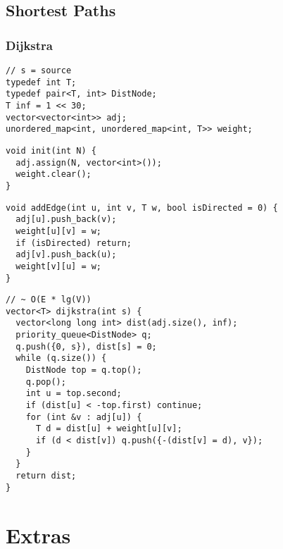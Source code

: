 \documentclass[twoside]{article}
\newcommand{\fileTitleStyle}{\raggedleft\underline}
\begin{document}
\begin{multicols*}{2}
\vspace{0em}
\subsection*{Shortest Paths}
\vspace{2em}
\subsubsectionfont{\fileTitleStyle}
\subsubsection*{Dijkstra}
\begin{verbatim}
// s = source
typedef int T;
typedef pair<T, int> DistNode;
T inf = 1 << 30;
vector<vector<int>> adj;
unordered_map<int, unordered_map<int, T>> weight;
\end{verbatim}
\vspace{-12pt}
\begin{verbatim}
void init(int N) {
  adj.assign(N, vector<int>());
  weight.clear();
}
\end{verbatim}
\vspace{-12pt}
\begin{verbatim}
void addEdge(int u, int v, T w, bool isDirected = 0) {
  adj[u].push_back(v);
  weight[u][v] = w;
  if (isDirected) return;
  adj[v].push_back(u);
  weight[v][u] = w;
}
\end{verbatim}
\vspace{-12pt}
\begin{verbatim}
// ~ O(E * lg(V))
vector<T> dijkstra(int s) {
  vector<long long int> dist(adj.size(), inf);
  priority_queue<DistNode> q;
  q.push({0, s}), dist[s] = 0;
  while (q.size()) {
    DistNode top = q.top();
    q.pop();
    int u = top.second;
    if (dist[u] < -top.first) continue;
    for (int &v : adj[u]) {
      T d = dist[u] + weight[u][v];
      if (d < dist[v]) q.push({-(dist[v] = d), v});
    }
  }
  return dist;
}
\end{verbatim}

\end{multicols*}
\newpage
\vspace{1em}
\section*{Extras}
\vspace{3em}
\vspace{0em}
\end{document}
